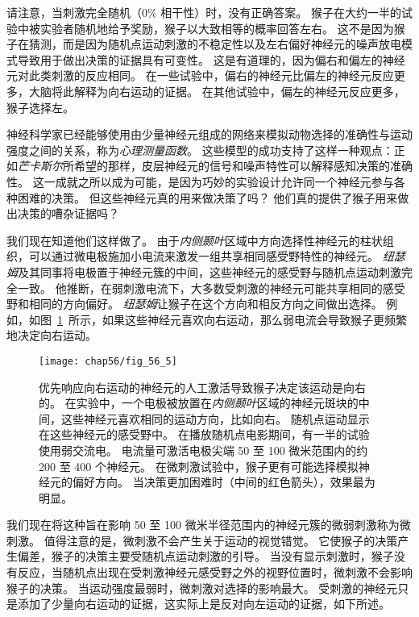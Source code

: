 请注意，当刺激完全随机（0\% 相干性）时，没有正确答案。
猴子在大约一半的试验中被实验者随机地给予奖励，猴子以大致相等的概率回答左右。
这不是因为猴子在猜测，而是因为随机点运动刺激的不稳定性以及左右偏好神经元的噪声放电模式导致用于做出决策的证据具有可变性。
这是有道理的，因为偏右和偏左的神经元对此类刺激的反应相同。
在一些试验中，偏右的神经元比偏左的神经元反应更多，大脑将此解释为向右运动的证据。
在其他试验中，偏左的神经元反应更多，猴子选择左。


神经科学家已经能够使用由少量神经元组成的网络来模拟动物选择的准确性与运动强度之间的关系，称为\textit{心理测量函数}。
这些模型的成功支持了这样一种观点：正如\textit{芒卡斯尔}所希望的那样，皮层神经元的信号和噪声特性可以解释感知决策的准确性。
这一成就之所以成为可能，是因为巧妙的实验设计允许同一个神经元参与各种困难的决策。
但这些神经元真的用来做决策了吗？
他们真的提供了猴子用来做出决策的嘈杂证据吗？


我们现在知道他们这样做了。
由于\textit{内侧颞叶}区域中方向选择性神经元的柱状组织，可以通过微电极施加小电流来激发一组共享相同感受野特性的神经元。
\textit{纽瑟姆}及其同事将电极置于神经元簇的中间，这些神经元的感受野与随机点运动刺激完全一致。
他推断，在弱刺激电流下，大多数受刺激的神经元可能共享相同的感受野和相同的方向偏好。
\textit{纽瑟姆}让猴子在这个方向和相反方向之间做出选择。
例如，如图~\ref{fig:56_5}~所示，如果这些神经元喜欢向右运动，那么弱电流会导致猴子更频繁地决定向右运动。


\begin{figure}[htbp]
	\centering
	\texttt{[image: chap56/fig\_56\_5]}
	\caption{优先响应向右运动的神经元的人工激活导致猴子决定该运动是向右的。
		在实验中，一个电极被放置在\textit{内侧颞叶}区域的神经元斑块的中间，这些神经元喜欢相同的运动方向，比如向右。
		随机点运动显示在这些神经元的感受野中。
		在播放随机点电影期间，有一半的试验使用弱交流电。
		电流量可激活电极尖端 50 至 100 微米范围内的约 200 至 400 个神经元。
		在微刺激试验中，猴子更有可能选择模拟神经元的偏好方向。
		当决策更加困难时（中间的红色箭头），效果最为明显\cite{ditterich2003microstimulation}。}
	\label{fig:56_5}
\end{figure}


我们现在将这种旨在影响 50 至 100 微米半径范围内的神经元簇的微弱刺激称为微刺激。
值得注意的是，微刺激不会产生关于运动的视觉错觉。
它使猴子的决策产生偏差，猴子的决策主要受随机点运动刺激的引导。
当没有显示刺激时，猴子没有反应，当随机点出现在受刺激神经元感受野之外的视野位置时，微刺激不会影响猴子的决策。
当运动强度最弱时，微刺激对选择的影响最大。
受刺激的神经元只是添加了少量向右运动的证据，这实际上是反对向左运动的证据，如下所述。


